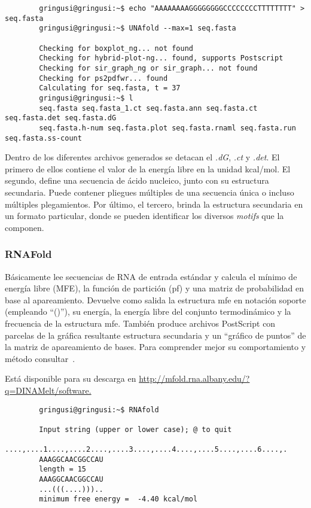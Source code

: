{\scriptsize
	\begin{verbatim}
        gringusi@gringusi:~$ echo "AAAAAAAAGGGGGGGGCCCCCCCCTTTTTTTT" > seq.fasta
        gringusi@gringusi:~$ UNAfold --max=1 seq.fasta

        Checking for boxplot_ng... not found
        Checking for hybrid-plot-ng... found, supports Postscript
        Checking for sir_graph_ng or sir_graph... not found
        Checking for ps2pdfwr... found
        Calculating for seq.fasta, t = 37
        gringusi@gringusi:~$ l
        seq.fasta seq.fasta_1.ct seq.fasta.ann seq.fasta.ct seq.fasta.det seq.fasta.dG 
        seq.fasta.h-num seq.fasta.plot seq.fasta.rnaml seq.fasta.run seq.fasta.ss-count
    \end{verbatim}
}

Dentro de los diferentes archivos generados se detacan el \emph{.dG}, \emph{.ct} y \emph{.det}. El primero de ellos contiene el valor de la energía libre en la unidad kcal/mol. El segundo,  define una secuencia de ácido nucleico, junto con su estructura secundaria. Puede contener pliegues múltiples de una secuencia única o incluso múltiples plegamientos. Por último, el tercero, brinda la estructura secundaria en un formato particular, donde se pueden identificar los diversos \emph{motifs} que la componen.

\subsubsection{RNAFold}
\label{rnafold}
\par Básicamente lee secuencias de RNA de entrada estándar y calcula el mínimo de energía libre (MFE), la función de partición (pf) y una matriz de probabilidad en base al apareamiento. Devuelve como salida la estructura mfe en notación soporte (empleando ``()''), su energía, la energía libre del conjunto termodinámico y la frecuencia de la estructura mfe. También produce archivos PostScript con parcelas de la gráfica resultante estructura secundaria y un ``gráfico de puntos'' de la matriz de apareamiento de bases. Para comprender mejor su comportamiento y método consultar~\cite{vienna}.

\par Está disponible para su descarga en \url{http://mfold.rna.albany.edu/?q=DINAMelt/software.}

{\scriptsize
	\begin{verbatim}
        gringusi@gringusi:~$ RNAfold

        Input string (upper or lower case); @ to quit
        ....,....1....,....2....,....3....,....4....,....5....,....6....,.
        AAAGGCAACGGCCAU
        length = 15
        AAAGGCAACGGCCAU
        ...(((....))).. 
        minimum free energy =  -4.40 kcal/mol
	\end{verbatim}
}

